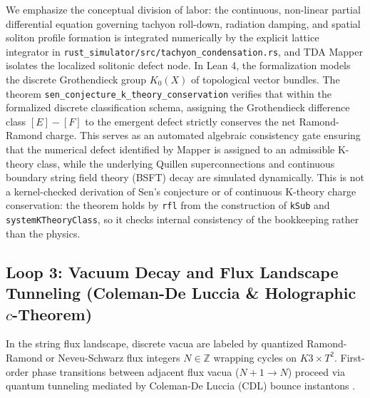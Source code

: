 \documentclass[11pt,a4paper]{article}
\begin{document}
We emphasize the conceptual division of labor: the continuous, non-linear partial differential equation governing tachyon roll-down, radiation damping, and spatial soliton profile formation is integrated numerically by the explicit lattice integrator in \texttt{rust\_simulator/src/tachyon\_condensation.rs}, and TDA Mapper isolates the localized solitonic defect node. In Lean 4, the formalization models the discrete Grothendieck group $K_0(X)$ of topological vector bundles. The theorem \texttt{sen\_conjecture\_k\_theory\_conservation} verifies that within the formalized discrete classification schema, assigning the Grothendieck difference class $[E] - [F]$ to the emergent defect strictly conserves the net Ramond-Ramond charge. This serves as an automated algebraic consistency gate ensuring that the numerical defect identified by Mapper is assigned to an admissible K-theory class, while the underlying Quillen superconnections and continuous boundary string field theory (BSFT) decay are simulated dynamically. This is not a kernel-checked derivation of Sen's conjecture or of continuous K-theory charge conservation: the theorem holds by \texttt{rfl} from the construction of \texttt{kSub} and \texttt{systemKTheoryClass}, so it checks internal consistency of the bookkeeping rather than the physics.

\subsection{Loop 3: Vacuum Decay and Flux Landscape Tunneling (Coleman-De Luccia \& Holographic \texorpdfstring{$c$}{c}-Theorem)}
In the string flux landscape, discrete vacua are labeled by quantized Ramond-Ramond or Neveu-Schwarz flux integers $N \in \mathbb{Z}$ wrapping cycles on $K3 \times T^2$. First-order phase transitions between adjacent flux vacua ($N+1 \to N$) proceed via quantum tunneling mediated by Coleman-De Luccia (CDL) bounce instantons \cite{coleman1980}.
\end{document}
